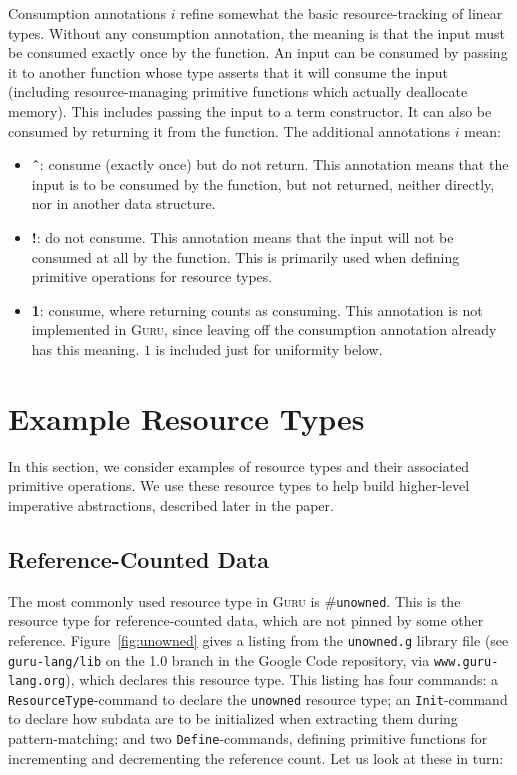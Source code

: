 \documentclass[9pt,natbib]{sigplanconf}
\begin{document}
Consumption annotations $i$ refine somewhat the basic
resource-tracking of linear types.  Without any consumption
annotation, the meaning is that the input must be consumed exactly
once by the function.  An input can be consumed by passing it to
another function whose type asserts that it will consume the input
(including resource-managing primitive functions which actually
deallocate memory).  This includes passing the input to a term
constructor.  It can also be consumed by returning it from the
function.  The additional annotations $i$ mean:

\begin{itemize}

\item \textbf{\^{\ }}: consume (exactly once) but do not return.  This annotation
  means that the input is to be consumed by the function, but not
  returned, neither directly, nor in another data structure.

\item \textbf{!}: do not consume.  This annotation means that the
  input will not be consumed at all by the function.  This is
  primarily used when defining primitive operations for resource
  types.

\item \textbf{1}: consume, where returning counts as consuming.  This
  annotation is not implemented in \textsc{Guru}, since leaving off
  the consumption annotation already has this meaning.  $1$ is included
  just for uniformity below.

\end{itemize}

\section{Example Resource Types}

In this section, we consider examples of resource types and their
associated primitive operations.  We use these resource types to
help build higher-level imperative abstractions, described later
in the paper.

\subsection{Reference-Counted Data}
\label{sec:unowned}

The most commonly used resource type in \textsc{Guru} is
\#\texttt{unowned}.  This is the resource type for reference-counted
data, which are not pinned by some other reference.
Figure~\ref{fig:unowned} gives a listing from the \texttt{unowned.g}
library file (see \texttt{guru-lang/lib} on the 1.0 branch in the
Google Code repository, via \texttt{www.guru-lang.org}), which
declares this resource type.  This listing has four commands: a
\texttt{ResourceType}-command to declare the \texttt{unowned} resource
type; an \texttt{Init}-command to declare how subdata are to be
initialized when extracting them during pattern-matching; and two
\texttt{Define}-commands, defining primitive functions for
incrementing and decrementing the reference count.  Let us look at
these in turn:
\end{document}
